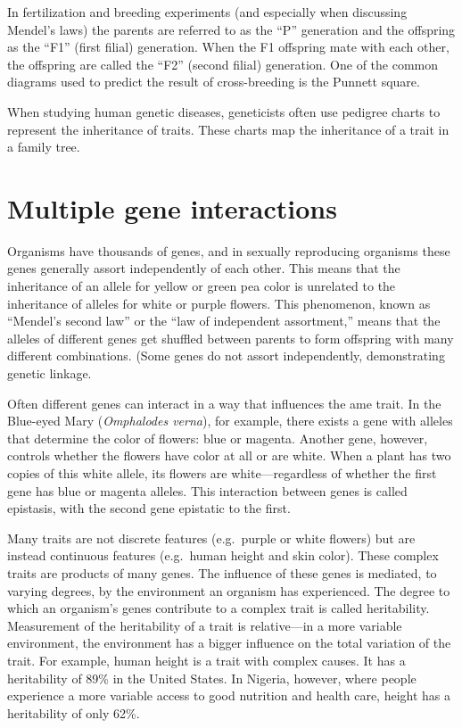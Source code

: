 In fertilization and breeding experiments (and especially when discussing Mendel's laws) the parents are referred to as the ``P'' generation and the offspring as the ``F1'' (first filial) generation. When the F1 offspring mate with each other, the offspring are called the ``F2'' (second filial) generation. One of the common diagrams used to predict the result of cross-breeding is the Punnett square.

When studying human genetic diseases, geneticists often use pedigree charts to represent the inheritance of traits. These charts map the inheritance of a trait in a family tree.

\hypertarget{multiple-gene-interactions}{%
\section{Multiple gene interactions}\label{multiple-gene-interactions}}

Organisms have thousands of genes, and in sexually reproducing organisms these genes generally assort independently of each other. This means that the inheritance of an allele for yellow or green pea color is unrelated to the inheritance of alleles for white or purple flowers. This phenomenon, known as ``Mendel's second law'' or the ``law of independent assortment,'' means that the alleles of different genes get shuffled between parents to form offspring with many different combinations. (Some genes do not assort independently, demonstrating genetic linkage.

Often different genes can interact in a way that influences the ame trait. In the Blue-eyed Mary (\emph{Omphalodes verna}), for example, there exists a gene with alleles that determine the color of flowers: blue or magenta. Another gene, however, controls whether the flowers have color at all or are white. When a plant has two copies of this white allele, its flowers are white---regardless of whether the first gene has blue or magenta alleles. This interaction between genes is called epistasis, with the second gene epistatic to the first.

Many traits are not discrete features (e.g.~purple or white flowers) but are instead continuous features (e.g.~human height and skin color). These complex traits are products of many genes. The influence of these genes is mediated, to varying degrees, by the environment an organism has experienced. The degree to which an organism's genes contribute to a complex trait is called heritability. Measurement of the heritability of a trait is relative---in a more variable environment, the environment has a bigger influence on the total variation of the trait. For example, human height is a trait with complex causes. It has a heritability of 89\% in the United States. In Nigeria, however, where people experience a more variable access to good nutrition and health care, height has a heritability of only 62\%.

